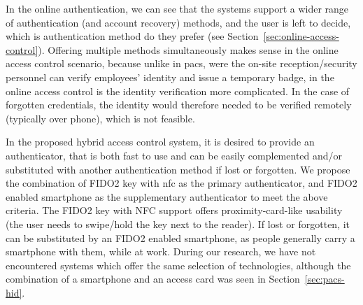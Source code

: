 In the online authentication, we can see that the systems support a wider range of authentication (and account recovery) methods, and the user is left to decide, which is authentication method do they prefer (see Section~\ref{sec:online-access-control}). Offering multiple methods simultaneously makes sense in the online access control scenario, because unlike in \acrshort{pacs}, were the on-site reception/security personnel can verify employees' identity and issue a temporary badge, in the online access control is the identity verification more complicated. In the case of forgotten credentials, the identity would therefore needed to be verified remotely (typically over phone), which is not feasible.

In the proposed hybrid access control system, it is desired to provide an authenticator, that is both fast to use and can be easily complemented and/or substituted with another authentication method if lost or forgotten. We propose the combination of FIDO2 key with \acrshort{nfc} as the primary authenticator, and FIDO2 enabled smartphone as the supplementary authenticator to meet the above criteria. The FIDO2 key with NFC support offers proximity-card-like usability (the user needs to swipe/hold the key next to the reader). If lost or forgotten, it can be substituted by an FIDO2 enabled smartphone, as people generally carry a smartphone with them, while at work. During our research, we have not encountered systems which offer the same selection of technologies, although the combination of a smartphone and an access card was seen in Section~\ref{sec:pacs-hid}.




